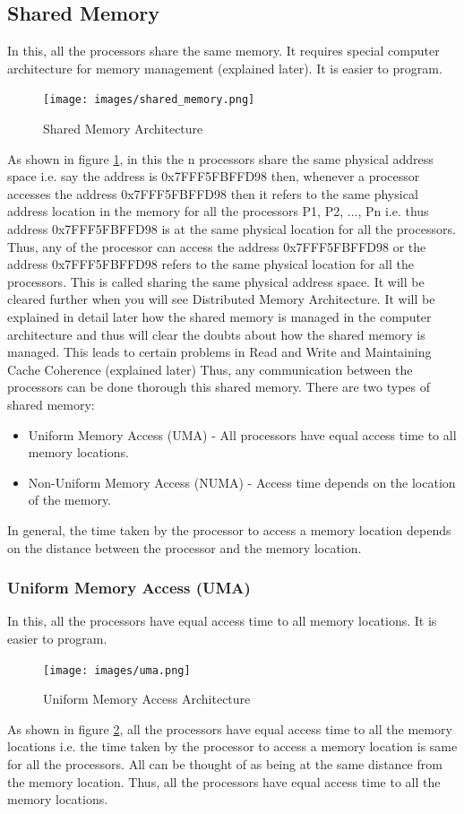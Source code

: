 \documentclass[12pt]{book}
\begin{document}
\subsection{Shared Memory}
In this, all the processors share the same memory. It requires special computer architecture for memory management (explained later). 
It is easier to program.
\begin{figure}[H]
    \centering
    \texttt{[image: images/shared\_memory.png]}
    \caption{Shared Memory Architecture}
    \label{fig:shared_memory}
\end{figure}
As shown in figure \ref{fig:shared_memory}, in this the n processors share the same physical address space i.e.
say the address is 0x7FFF5FBFFD98 then, whenever a processor accesses the address 0x7FFF5FBFFD98 then it refers to the same physical address location in the memory 
for all the processors P1, P2, ..., Pn i.e. thus address 0x7FFF5FBFFD98 is at the same physical location for
all the processors. Thus, any of the processor can access the address 0x7FFF5FBFFD98 or the address 0x7FFF5FBFFD98 refers to the 
same physical location for all the processors. This is called sharing the same physical address space.
It will be cleared further when you will see Distributed Memory Architecture.
It will be explained in detail later how the shared memory is managed in the computer architecture and thus will clear the doubts about how the shared memory is managed. 
This leads to certain problems in Read and Write and Maintaining Cache Coherence (explained later)
Thus, any communication between the processors can be done thorough this shared memory. 
There are two types of shared memory:
\begin{itemize}
    \item Uniform Memory Access (UMA) - All processors have equal access time to all memory locations.
    \item Non-Uniform Memory Access (NUMA) - Access time depends on the location of the memory.
\end{itemize}
In general, the time taken by the processor to access a memory location depends on the 
distance between the processor and the memory location.
\subsubsection{Uniform Memory Access (UMA)}
In this, all the processors have equal access time to all memory locations. It is easier to program.
\begin{figure}[H]
    \centering
    \texttt{[image: images/uma.png]}
    \caption{Uniform Memory Access Architecture}
    \label{fig:uma}
\end{figure}
As shown in figure \ref{fig:uma}, all the processors have equal access time to all the memory locations i.e.
the time taken by the processor to access a memory location is same for all the processors. All can be thought of as being at 
the same distance from the memory location. Thus, all the processors have equal access time to all the memory locations.
\end{document}
